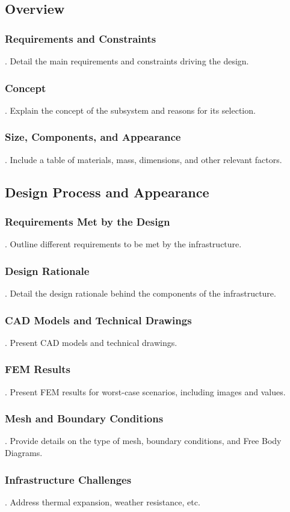 \subsection{Overview}
\subsubsection{Requirements and Constraints}
.  Detail the main requirements and constraints driving the design.
\subsubsection{Concept}
.  Explain the concept of the subsystem and reasons for its selection.
\subsubsection{Size, Components, and Appearance}
.  Include a table of materials, mass, dimensions, and other relevant factors.

\subsection{Design Process and Appearance}
\subsubsection{Requirements Met by the Design}
.  Outline different requirements to be met by the infrastructure.
\subsubsection{Design Rationale}
.  Detail the design rationale behind the components of the infrastructure.
\subsubsection{CAD Models and Technical Drawings}
.  Present CAD models and technical drawings.
\subsubsection{FEM Results}
.  Present FEM results for worst-case scenarios, including images and values.
\subsubsection{Mesh and Boundary Conditions}
.  Provide details on the type of mesh, boundary conditions, and Free Body Diagrams.
\subsubsection{Infrastructure Challenges}
.  Address thermal expansion, weather resistance, etc.

